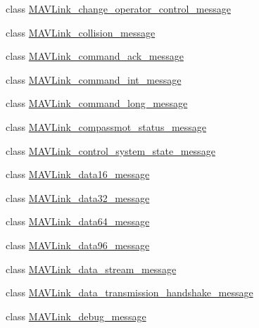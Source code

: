 \begin{DoxyCompactItemize}
\item 
class \hyperlink{classpymavlink_1_1dialects_1_1v10_1_1MAVLink__change__operator__control__message}{M\+A\+V\+Link\+\_\+change\+\_\+operator\+\_\+control\+\_\+message}
\item 
class \hyperlink{classpymavlink_1_1dialects_1_1v10_1_1MAVLink__collision__message}{M\+A\+V\+Link\+\_\+collision\+\_\+message}
\item 
class \hyperlink{classpymavlink_1_1dialects_1_1v10_1_1MAVLink__command__ack__message}{M\+A\+V\+Link\+\_\+command\+\_\+ack\+\_\+message}
\item 
class \hyperlink{classpymavlink_1_1dialects_1_1v10_1_1MAVLink__command__int__message}{M\+A\+V\+Link\+\_\+command\+\_\+int\+\_\+message}
\item 
class \hyperlink{classpymavlink_1_1dialects_1_1v10_1_1MAVLink__command__long__message}{M\+A\+V\+Link\+\_\+command\+\_\+long\+\_\+message}
\item 
class \hyperlink{classpymavlink_1_1dialects_1_1v10_1_1MAVLink__compassmot__status__message}{M\+A\+V\+Link\+\_\+compassmot\+\_\+status\+\_\+message}
\item 
class \hyperlink{classpymavlink_1_1dialects_1_1v10_1_1MAVLink__control__system__state__message}{M\+A\+V\+Link\+\_\+control\+\_\+system\+\_\+state\+\_\+message}
\item 
class \hyperlink{classpymavlink_1_1dialects_1_1v10_1_1MAVLink__data16__message}{M\+A\+V\+Link\+\_\+data16\+\_\+message}
\item 
class \hyperlink{classpymavlink_1_1dialects_1_1v10_1_1MAVLink__data32__message}{M\+A\+V\+Link\+\_\+data32\+\_\+message}
\item 
class \hyperlink{classpymavlink_1_1dialects_1_1v10_1_1MAVLink__data64__message}{M\+A\+V\+Link\+\_\+data64\+\_\+message}
\item 
class \hyperlink{classpymavlink_1_1dialects_1_1v10_1_1MAVLink__data96__message}{M\+A\+V\+Link\+\_\+data96\+\_\+message}
\item 
class \hyperlink{classpymavlink_1_1dialects_1_1v10_1_1MAVLink__data__stream__message}{M\+A\+V\+Link\+\_\+data\+\_\+stream\+\_\+message}
\item 
class \hyperlink{classpymavlink_1_1dialects_1_1v10_1_1MAVLink__data__transmission__handshake__message}{M\+A\+V\+Link\+\_\+data\+\_\+transmission\+\_\+handshake\+\_\+message}
\item 
class \hyperlink{classpymavlink_1_1dialects_1_1v10_1_1MAVLink__debug__message}{M\+A\+V\+Link\+\_\+debug\+\_\+message}
\item 

\end{DoxyCompactItemize}
